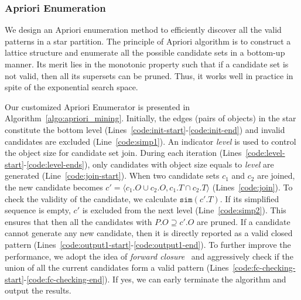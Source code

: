 \subsubsection{Apriori Enumeration}
We design an Apriori enumeration method to efficiently discover all the valid patterns in a star partition. The principle of Apriori algorithm is to construct a lattice structure and enumerate all the possible candidate sets in a bottom-up manner. Its merit lies in the monotonic property such that if a candidate set is not valid, then all its supersets can be pruned. Thus, it works well in practice in spite of the exponential search space.

Our customized Apriori Enumerator is presented in Algorithm~\ref{algo:apriori_mining}. Initially, the edges (pairs of objects) in the star constitute the bottom level (Lines~\ref{code:init-start}-\ref{code:init-end}) and invalid candidates are excluded (Line~\ref{code:simp1}). An indicator \emph{level} is used to control the object size for candidate set join. During each iteration (Lines~\ref{code:level-start}-\ref{code:level-ends}), only candidates with object size equals to \emph{level} are generated (Line~\ref{code:join-start}). When two candidate sets $c_1$ and $c_2$ are joined, the new candidate becomes $c'=\langle c_1.O \cup c_2.O, c_1.T\cap c_2.T\rangle$ (Lines~\ref{code:join}). To check the validity of the candidate, we calculate $\mathtt{sim}(c'.T)$. If its simplified sequence is empty, $c'$ is excluded from the next level (Line~\ref{code:simp2}). This ensures that
then all the candidates with $P.O\supseteq c'.O$ are pruned. If a candidate cannot generate any new candidate, then it is directly reported as a valid closed pattern (Lines~\ref{code:output1-start}-\ref{code:output1-end}).
To further improve the performance, we adopt the idea of \textit{forward closure}~\cite{wang2003closet+,pei2000closet} and  aggressively check if the union of all the current candidates form a valid pattern (Lines~\ref{code:fc-checking-start}-\ref{code:fc-checking-end}). If yes, we can early terminate the algorithm and output the results.

